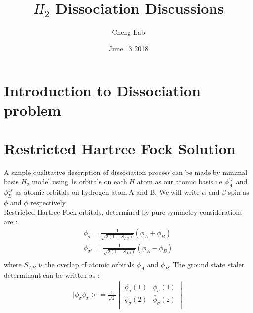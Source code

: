 \documentclass[11pt]{article}   	%
\begin{document}
\title{$H_2$ Dissociation Discussions}
\author{Cheng Lab}
\date{June 13 2018}							%
\maketitle
\section{Introduction to Dissociation problem}
\section{Restricted Hartree Fock Solution}
	A simple qualitative description of dissociation process can be made by minimal basis $H_2$ model using 1s orbitals on each $H$ atom as our atomic basis
	i.e $\phi_A^{1s}$ and $\phi_B^{1s}$ as atomic orbitals on hydrogen atom A and B.  
	We will write $\alpha$ and $\beta$ spin as $\phi$ and $\bar{\phi}$ respectively. \\
	Restricted Hartree Fock orbitals, determined by pure symmetry considerations are :\\ 
	\begin{equation}
	\begin{split}
	\phi_{\sigma}=\frac{1}{\sqrt{2(1+S_{AB})}}(\phi_A+\phi_B) \\	
	\phi_{\sigma^*}=\frac{1}{\sqrt{2(1-S_{AB})}}(\phi_A-\phi_B) \\
	\end{split}
	\end{equation}
	where $S_{AB}$ is the overlap of atomic orbitals $\phi_A$ and $\phi_B$. The ground state staler determinant can be written as :\\
	\begin{equation}
	\begin{split}
	|\phi_{\sigma}\bar{\phi}_{\sigma}>=\frac{1}{\sqrt{2}} \begin{vmatrix}\phi_{\sigma}(1) 
	& \bar{\phi}_{\sigma}(1) \\  \phi_{\sigma}(2) & \bar{\phi}_{\sigma}(2) \\ \end{vmatrix}  \\
	\end{split}
	\end{equation}
	
\end{document}
